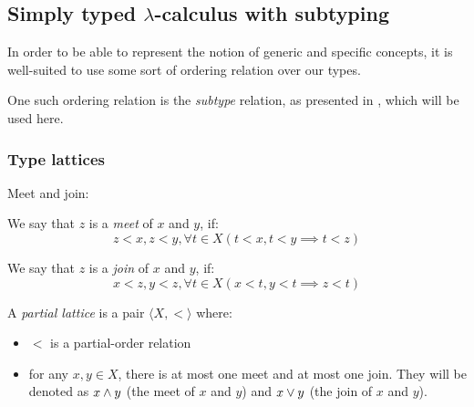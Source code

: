 \documentclass[main.tex]{subfiles}
\begin{document}
\subsection{Simply typed $\lambda$-calculus with subtyping}
\label{sec:lambda}

In order to be able to represent the notion of generic and specific concepts,
it is well-suited to use some sort of ordering relation over our types.

One such ordering relation is the \emph{subtype} relation, as presented in
\cite[chap.~15]{pierce}, which will be used here.


\subsubsection{Type lattices}
\begin{defn}
    Meet and join:
    
    We say that $z$ is a \emph{meet} of $x$ and $y$, if:
    \begin{equation}
        z \less x, z \less y,
            \forall t \in X (t \less x, t \less y \implies t \less z)
    \end{equation}
        
    We say that $z$ is a \emph{join} of $x$ and $y$, if:
    \begin{equation}
        x \less z, y \less z,
            \forall t \in X (x \less t, y \less t \implies z \less t)
    \end{equation}
\end{defn}

\begin{defn}
    A \emph{partial lattice} is a pair $\langle X, \less \rangle$ where:
    \begin{itemize}
        \item $\less$ is a partial-order relation
        \item for any $x, y \in X$, there is at most one meet and at most one join.
            They will be denoted as $x \wedge y$ (the meet of $x$ and $y$) and
            $x \vee y$ (the join of $x$ and $y$).
    \end{itemize}
\end{defn}
\end{document}
